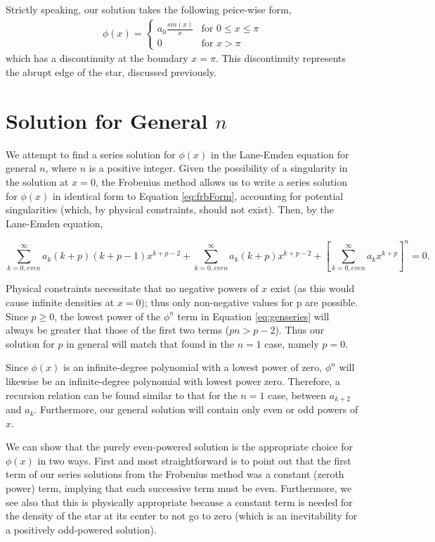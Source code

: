 \documentclass[12pt, manuscript]{article}
\begin{document}
Strictly speaking, our solution takes the following peice-wise form,
\begin{align}
\phi(x)=
\begin{cases}
a_{0}\frac{sin(x)}{x} & \text{for $0\le x\le\pi$}\\
0 & \text{for $x>\pi$}
\end{cases}
\end{align}
which has a discontinuity at the boundary $x=\pi$. This discontinuity represents the abrupt edge of the star, discussed previously.


\section*{Solution for General $n$}
\noindent We attempt to find a series solution for $\phi \left( x \right)$ in the Lane-Emden equation for general $n$, where $n$ is a positive integer. Given the possibility of a singularity in the solution at $x = 0$, the Frobenius method allows us to write a series solution for $\phi \left( x \right)$ in identical form to Equation \eqref{eq:frbForm}, accounting for potential singularities (which, by physical constraints, should not exist). Then, by the Lane-Emden equation,

\begin{equation}
\sum_{k=0,even}^{\infty}a_k\left(k+p\right)\left(k+p-1\right)x^{k+p-2}+\sum_{k=0,even}^{\infty}a_k\left(k+p\right)x^{k+p-2}+\left[\sum_{k=0,even}^{\infty}a_kx^{k+p}\right]^n=0.\label{eq:genseries}
\end{equation}

\noindent Physical constraints necessitate that no negative powers of $x$ exist (as this would cause infinite densities at $x=0$); thus only non-negative values for p are possible. Since $p \geq 0$, the lowest power of the $\phi^n$ term in Equation \eqref{eq:genseries} will always be greater that those of the first two terms ($pn > p-2$). Thus our solution for $p$ in general will match that found in the $n=1$ case, namely $p=0$.

\noindent Since $\phi\left(x\right)$ is an infinite-degree polynomial with a lowest power of zero, $\phi^n$ will likewise be an infinite-degree polynomial with lowest power zero. Therefore, a recursion relation can be found similar to that for the $n=1$ case, between $a_{k+2}$ and $a_{k}$. Furthermore, our general solution will contain only even or odd powers of $x$.

\noindent We can show that the purely even-powered solution is the appropriate choice for $\phi \left( x \right)$ in two ways. First and most straightforward is to point out that the first term of our series solutions from the Frobenius method was a constant (zeroth power) term, implying that each successive term must be even. Furthermore, we see also that this is physically appropriate because a constant term is needed for the density of the star at its center to not go to zero (which is an inevitability for a positively odd-powered solution).  
\end{document}

